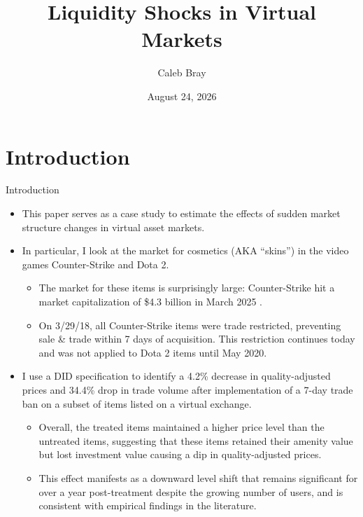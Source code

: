 \documentclass[xcolor=table, envcountsect,12pt]{beamer}
\title{Liquidity Shocks in Virtual Markets}
\author{Caleb Bray}
\date{August 24, 2026}
\theoremstyle{remark}
\theoremstyle{theorem}
\theoremstyle{plain}
\begin{document}
	\begin{frame}
		\titlepage
	\end{frame}

	
	
\section{Introduction}

\begin{frame}[shrink=3]{Introduction}
	\begin{itemize}
		\item \footnotesize This paper serves as a case study to estimate the effects of sudden market structure changes in virtual asset markets.
		\item \footnotesize In particular, I look at the market for cosmetics (AKA ``skins'') in the video games Counter-Strike and Dota 2.
		\begin{itemize}
			\item \scriptsize The market for these items is surprisingly large: Counter-Strike hit a market capitalization of \$4.3 billion in March 2025 \autocite{bloomberg2025-03-07}.
			\item \scriptsize On 3/29/18, all Counter-Strike items were trade restricted, preventing sale \& trade within 7 days of acquisition. This restriction continues today and was not applied to Dota 2 items until May 2020.
		\end{itemize}
		\item \footnotesize I use a DID specification to identify a 4.2\% decrease in quality-adjusted prices and 34.4\% drop in trade volume after implementation of a 7-day trade ban on a subset of items listed on a virtual exchange.
		\begin{itemize}
			\item \scriptsize Overall, the treated items maintained a higher price level than the untreated items, suggesting that these items retained their amenity value but lost investment value causing a dip in quality-adjusted prices.
			\item \scriptsize This effect manifests as a downward level shift that remains significant for over a year post-treatment despite the growing number of users, and is consistent with empirical findings in the literature.
		\end{itemize}
	\end{itemize}
\end{frame}
\end{document}
